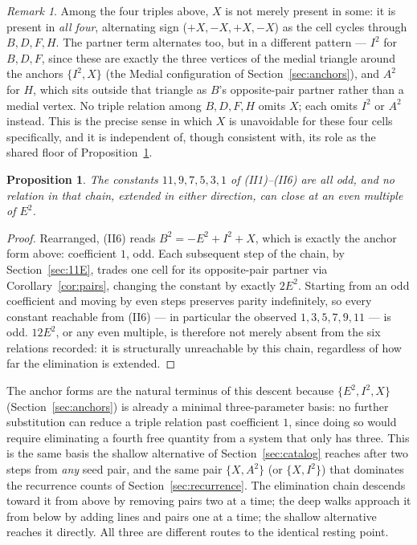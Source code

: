\documentclass[12pt]{article}
\newtheorem{proposition}[theorem]{Proposition}
\theoremstyle{remark}
\newtheorem{remark}[theorem]{Remark}
\begin{document}
\begin{remark}
Among the four triples above, $X$ is not merely present in some: it is
present in \emph{all four}, alternating sign
($+X,-X,+X,-X$) as the cell cycles through $B,D,F,H$. The partner term
alternates too, but in a different pattern --- $I^2$ for $B,D,F$, since
these are exactly the three vertices of the medial triangle around the
anchors $\{I^2,X\}$ (the Medial configuration of
Section~\ref{sec:anchors}), and $A^2$ for $H$, which sits outside that
triangle as $B$'s opposite-pair partner rather than a medial vertex.
No triple relation among $B,D,F,H$ omits $X$; each omits $I^2$ or
$A^2$ instead. This is the precise sense in which $X$ is unavoidable
for these four cells specifically, and it is independent of, though
consistent with, its role as the shared floor of
Proposition~\ref{prop:parity11}.
\end{remark}

\begin{proposition}\label{prop:parity11}
The constants $11,9,7,5,3,1$ of (II1)--(II6) are all odd, and no
relation in that chain, extended in either direction, can close at an
even multiple of $E^2$.
\end{proposition}

\begin{proof}
Rearranged, (II6) reads $B^2=-E^2+I^2+X$, which is exactly the anchor
form above: coefficient $1$, odd. Each subsequent step of the chain,
by Section~\ref{sec:11E}, trades one cell for its opposite-pair
partner via Corollary~\ref{cor:pairs}, changing the constant by
exactly $2E^2$. Starting from an odd coefficient and moving by even
steps preserves parity indefinitely, so every constant reachable from
(II6) --- in particular the observed $1,3,5,7,9,11$ --- is odd.
$12E^2$, or any even multiple, is therefore not merely absent from the
six relations recorded: it is structurally unreachable by this chain,
regardless of how far the elimination is extended.
\end{proof}

The anchor forms are the natural terminus of this descent because
$\{E^2,I^2,X\}$ (Section~\ref{sec:anchors}) is already a minimal
three-parameter basis: no further substitution can reduce a triple
relation past coefficient $1$, since doing so would require
eliminating a fourth free quantity from a system that only has three.
This is the same basis the shallow alternative of
Section~\ref{sec:catalog} reaches after two steps from \emph{any} seed
pair, and the same pair $\{X,A^2\}$ (or $\{X,I^2\}$) that dominates the
recurrence counts of Section~\ref{sec:recurrence}. The elimination
chain descends toward it from above by removing pairs two at a time;
the deep walks approach it from below by adding lines and pairs one at
a time; the shallow alternative reaches it directly. All three are
different routes to the identical resting point.
\end{document}

